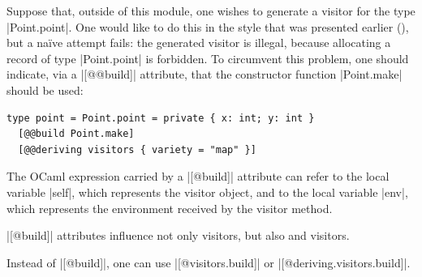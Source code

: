 \documentclass[11pt,a4paper,twoside]{article}
\begin{document}
\enlargethispage{\baselineskip} %

Suppose that, outside of this module, one wishes to generate a \map visitor
for the type \oc|Point.point|. One would like to do this in the style that was
presented earlier (), but a naïve attempt fails: the
generated visitor is illegal, because allocating a record of type
\oc|Point.point| is forbidden. To circumvent this problem, one should
indicate, via a \oc|[@@build]| attribute, that the constructor function
\oc|Point.make| should be used:
%
\begin{origenv}
\begin{lstlisting}
type point = Point.point = private { x: int; y: int }
  [@@build Point.make]
  [@@deriving visitors { variety = "map" }]
\end{lstlisting}
\end{origenv}
%

The OCaml expression carried by a \oc|[@build]| attribute can refer to the
local variable \oc|self|, which represents the visitor object, and to the
local variable \oc|env|, which represents the environment received by the
visitor method.

\oc|[@build]| attributes influence not only \map visitors,
but also \mapendo and \mapreduce visitors.

Instead of \oc|[@build]|, one can use
\oc|[@visitors.build]| or \oc|[@deriving.visitors.build]|.



\clearpage



\end{document}
